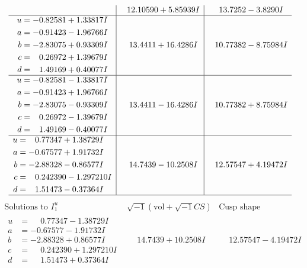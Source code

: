 \documentclass[1p]{elsarticle_modified}
\theoremstyle{definition}
\newcommand{\I}{\sqrt{-1}}
\begin{document}
$$\begin{array}{c|c|c}
 & \phantom{-}12.10590 + 5.85939 I & \phantom{-}13.7252 - 3.8290 I \\ \hline\begin{aligned}
u &= -0.82581 + 1.33817 I \\
a &= -0.91423 - 1.96766 I \\
b &= -2.83075 + 0.93309 I \\
c &= \phantom{-}0.26972 + 1.39679 I \\
d &= \phantom{-}1.49169 + 0.40077 I\end{aligned}
 & \phantom{-}13.4411 + 16.4286 I & \phantom{-}10.77382 - 8.75984 I \\ \hline\begin{aligned}
u &= -0.82581 - 1.33817 I \\
a &= -0.91423 + 1.96766 I \\
b &= -2.83075 - 0.93309 I \\
c &= \phantom{-}0.26972 - 1.39679 I \\
d &= \phantom{-}1.49169 - 0.40077 I\end{aligned}
 & \phantom{-}13.4411 - 16.4286 I & \phantom{-}10.77382 + 8.75984 I \\ \hline\begin{aligned}
u &= \phantom{-}0.77347 + 1.38729 I \\
a &= -0.67577 + 1.91732 I \\
b &= -2.88328 - 0.86577 I \\
c &= \phantom{-}0.242390 - 1.297210 I \\
d &= \phantom{-}1.51473 - 0.37364 I\end{aligned}
 & \phantom{-}14.7439 - 10.2508 I & \phantom{-}12.57547 + 4.19472 I\\
 \hline 
 \end{array}$$\newpage$$\begin{array}{c|c|c}  
\text{Solutions to }I^u_{1}& \I (\text{vol} + \sqrt{-1}CS) & \text{Cusp shape}\\
 \hline 
\begin{aligned}
u &= \phantom{-}0.77347 - 1.38729 I \\
a &= -0.67577 - 1.91732 I \\
b &= -2.88328 + 0.86577 I \\
c &= \phantom{-}0.242390 + 1.297210 I \\
d &= \phantom{-}1.51473 + 0.37364 I\end{aligned}
 & \phantom{-}14.7439 + 10.2508 I & \phantom{-}12.57547 - 4.19472 I \\ \hline\begin{aligned}

\end{aligned}
\end{array}$$
\end{document}
